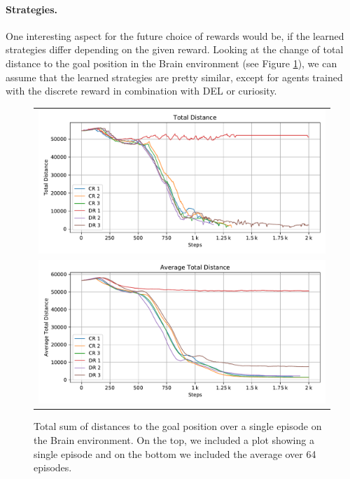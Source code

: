 \paragraph{Strategies.}
One interesting aspect for the future choice of rewards would be, if the learned strategies differ depending on the given reward. Looking at the change of total distance to the goal position in the Brain environment (see Figure \ref{fig:Rewards/Ep_Analysis}), we can assume that the learned strategies are pretty similar, except for agents trained with the discrete reward in combination with DEL or curiosity.  

\begin{figure}[htp]
    \begin{center}
        \begin{tabular}{c}
            \includegraphics[clip, width=0.95\columnwidth]{figures/evaluation/rewards/episode_analysis/maze0122_total_dist.pdf} \\
            \includegraphics[clip, width=0.95\columnwidth]{figures/evaluation/rewards/episode_analysis/maze0122_total_dist_avg.pdf} \\
        \end{tabular}
    \end{center}
    \caption[Episode metrics on the Brain Environment]{Total sum of distances to the goal position over a single episode on the Brain environment. On the top, we included a plot showing a single episode and on the bottom we included the average over 64 episodes.} \label{fig:Rewards/Ep_Analysis}
\end{figure}

